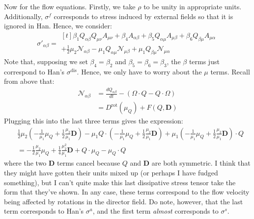 \documentclass[reqno]{article}
\newcommand\rot{\text{rot}}
\newcommand\dis{\text{dis}}
\begin{document}
Now for the flow equations.
Firstly, we take $\rho$ to be unity in appropriate units.
Additionally, $\sigma^f$ corresponds to stress induced by external fields so
that it is ignored in Han.
Hence, we consider:
\begin{equation}
  \sigma'_{\alpha \beta}
  =
  \begin{multlined}[t]
  \beta_1 Q_{\alpha \beta} Q_{\mu \nu} A_{\mu \nu}
  + \beta_4 A_{\alpha \beta}
  + \beta_5 Q_{\alpha \mu} A_{\mu \beta}
  + \beta_6 Q_{\beta \mu} A_{\mu \alpha} \\
  + \tfrac12 \mu_2 \mathcal{N}_{\alpha \beta}
  - \mu_1 Q_{\alpha \mu} \mathcal{N}_{\mu \beta}
  + \mu_1 Q_{\beta \mu} \mathcal{N}_{\mu \alpha}
\end{multlined}
\end{equation}
Note that, supposing we set $\beta_4 = \beta_2$ and $\beta_5 = \beta_6 =
\beta_3$, the $\beta$ terms just correspond to Han's $\sigma^\dis$.
Hence, we only have to worry about the $\mu$ terms.
Recall from above that:
\begin{align*}
  \mathcal{N}_{\alpha \beta}
  &= \frac{d Q_{\alpha \beta}}{dt}
    - (\Omega \cdot Q - Q \cdot \Omega) \\
  &= D^\rot (\mu_Q) + F(Q, \mathbf{D})
\end{align*}
Plugging this into the last three terms gives the expression:
\begin{equation}
\begin{split}
  &\frac12 \mu_2 \left( -\frac{1}{\mu_1} \mu_Q + \frac12 \frac{\mu_2}{\mu_1} \mathbf{D} \right)
  - \mu_1 Q \cdot \left( -\frac{1}{\mu_1} \mu_Q + \frac12 \frac{\mu_2}{\mu_1} \mathbf{D} \right) 
  + \mu_1 \left( -\frac{1}{\mu_1} \mu_Q + \frac12 \frac{\mu_2}{\mu_1} \mathbf{D} \right) \cdot Q \\
  &= -\frac12 \frac{\mu_2}{\mu_1}\mu_Q
  + \frac14 \frac{\mu_2^2}{\mu_1} \mathbf{D}
  + Q \cdot \mu_Q - \mu_Q \cdot Q
\end{split}
\end{equation}
where the two $\mathbf{D}$ terms cancel because $Q$ and $\mathbf{D}$ are both
symmetric.
I think that they might have gotten their units mixed up (or perhaps I have
fudged something), but I can't quite
make this last dissipative stress tensor take the form that they've shown.
In any case, these terms correspond to the flow velocity being affected by
rotations in the director field.
Do note, however, that the last term corresponds to Han's $\sigma^a$, and the
first term \textit{almost} corresponds to $\sigma^s$.
\end{document}

